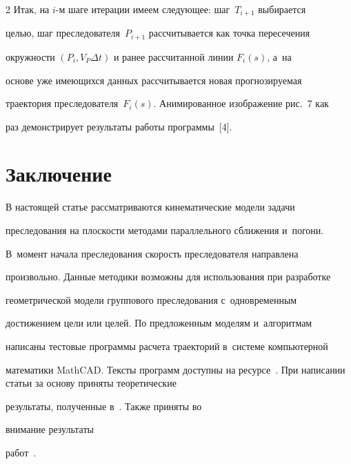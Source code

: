 \begin{multicols}{2}
  Итак, на $i$-м шаге итерации имеем сле\-ду\-ющее: шаг~$T_{i+1}$ выбирается 


целью, шаг преследователя~$P_{i+1}$ рассчитывается как точка пересечения 


окружности $(P_i, V_P \Delta t)$ и ранее рассчитанной линии $F_i(s)$, а~на 


основе уже имеющихся данных рассчитывается новая прогнозируемая 


траектория преследователя~$F_i(s)$. Анимированное изображение рис.~7 как 


раз демонстрирует результаты работы программы~[4]. 





\section{Заключение}





   В настоящей статье рассматриваются кинематические модели задачи 


преследования на плос\-кости методами параллельного сбли\-же\-ния и~погони. 


В~момент начала преследования ско\-рость преследователя на\-прав\-ле\-на 


произвольно. Данные методики возможны для использования при разработке 


геометрической модели группового пре\-сле\-до\-ва\-ния с~одновременным 


достижением цели или целей. По предложенным моделям и~алгоритмам 


написаны тес\-то\-вые программы расчета траекторий в~сис\-те\-ме компьютерной 


математики MathCAD. Тексты программ доступны на ресурсе~\cite{13-dub}. При написании статьи за основу приняты теоретические 


результаты, полученные в~\cite{1-dub, 2-dub, 3-dub}. Также приняты во 


внимание результаты  


работ~\cite{4-dub, 5-dub, 6-dub, 7-dub, 8-dub, 9-dub, 10-dub}.


   


{\small\frenchspacing


 {%




}}
\end{multicols}
